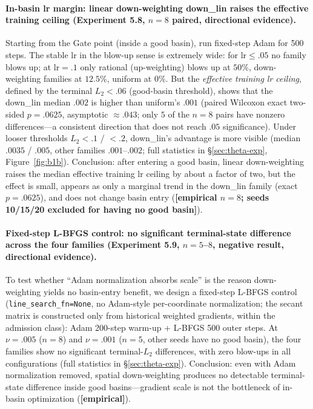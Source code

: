 \documentclass[11pt]{article}
\numberwithin{equation}{section}
\begin{document}
\paragraph{In-basin lr margin: linear down-weighting down\_lin raises the effective training ceiling (Experiment 5.8, $n=8$ paired, directional evidence).}
Starting from the Gate point (inside a good basin), run fixed-step Adam for 500 steps. The stable lr in the blow-up sense is extremely wide: for lr$\le.05$ no family blows up; at lr$=.1$ only rational (up-weighting) blows up at $50\%$, down-weighting families at $12.5\%$, uniform at $0\%$. But the \emph{effective training lr ceiling}, defined by the terminal $L_2<.06$ (good-basin threshold), shows that the down\_lin median $.002$ is higher than uniform's $.001$ (paired Wilcoxon exact two-sided $p=.0625$, asymptotic $\approx.043$; only $5$ of the $n=8$ pairs have nonzero differences---a consistent direction that does not reach $.05$ significance). Under looser thresholds $L_2<.1$ / $<.2$, down\_lin's advantage is more visible (median $.0035$ / $.005$, other families $.001$--$.002$; full statistics in \S\ref{sec:theta-exp}, Figure~\ref{fig:b1b}). Conclusion: after entering a good basin, linear down-weighting raises the median effective training lr ceiling by about a factor of two, but the effect is small, appears as only a marginal trend in the down\_lin family (exact $p=.0625$), and does not change basin entry (\textbf{[empirical $n=8$; seeds 10/15/20 excluded for having no good basin]}).

\paragraph{Fixed-step L-BFGS control: no significant terminal-state difference across the four families (Experiment 5.9, $n=5$--$8$, negative result, directional evidence).}
To test whether ``Adam normalization absorbs scale'' is the reason down-weighting yields no basin-entry benefit, we design a fixed-step L-BFGS control (\texttt{line\_search\_fn=None}, no Adam-style per-coordinate normalization; the secant matrix is constructed only from historical weighted gradients, within the admission class): Adam 200-step warm-up + L-BFGS 500 outer steps. At $\nu=.005$ ($n=8$) and $\nu=.001$ ($n=5$, other seeds have no good basin), the four families show no significant terminal-$L_2$ differences, with zero blow-ups in all configurations (full statistics in \S\ref{sec:theta-exp}). Conclusion: even with Adam normalization removed, spatial down-weighting produces no detectable terminal-state difference inside good basins---gradient scale is not the bottleneck of in-basin optimization (\textbf{[empirical]}).
\end{document}
